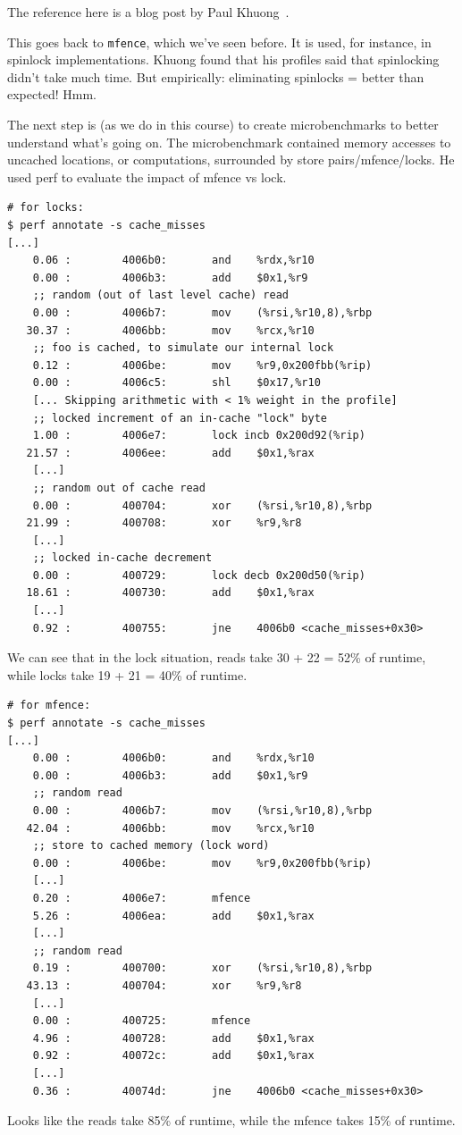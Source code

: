 \documentclass[a4paper]{report}
\begin{document}
The reference here is a blog post by Paul Khuong~\cite{metrics}.

This goes back to {\tt mfence}, which we've seen before. It is used, for instance, in
spinlock implementations. Khuong found that his profiles said that spinlocking didn't take much time.
But empirically: eliminating spinlocks = better than expected! Hmm.

The next step is (as we do in this course) to create microbenchmarks to better understand what's
going on. The microbenchmark contained memory accesses to uncached locations, or computations,
surrounded by store pairs/mfence/locks. He used perf to evaluate the impact of mfence vs lock.

{\scriptsize
\begin{lstlisting}
# for locks:
$ perf annotate -s cache_misses
[...]
    0.06 :        4006b0:       and    %rdx,%r10
    0.00 :        4006b3:       add    $0x1,%r9
    ;; random (out of last level cache) read
    0.00 :        4006b7:       mov    (%rsi,%r10,8),%rbp
   30.37 :        4006bb:       mov    %rcx,%r10
    ;; foo is cached, to simulate our internal lock
    0.12 :        4006be:       mov    %r9,0x200fbb(%rip)
    0.00 :        4006c5:       shl    $0x17,%r10
    [... Skipping arithmetic with < 1% weight in the profile]
    ;; locked increment of an in-cache "lock" byte
    1.00 :        4006e7:       lock incb 0x200d92(%rip)
   21.57 :        4006ee:       add    $0x1,%rax
    [...]
    ;; random out of cache read
    0.00 :        400704:       xor    (%rsi,%r10,8),%rbp
   21.99 :        400708:       xor    %r9,%r8
    [...]
    ;; locked in-cache decrement
    0.00 :        400729:       lock decb 0x200d50(%rip)
   18.61 :        400730:       add    $0x1,%rax
    [...]
    0.92 :        400755:       jne    4006b0 <cache_misses+0x30>
\end{lstlisting}
}

We can see that in the lock situation, reads take 30 + 22 = 52\% of runtime,
while locks take 19 + 21 = 40\% of runtime.

{\scriptsize
\begin{lstlisting}
# for mfence:
$ perf annotate -s cache_misses
[...]
    0.00 :        4006b0:       and    %rdx,%r10
    0.00 :        4006b3:       add    $0x1,%r9
    ;; random read
    0.00 :        4006b7:       mov    (%rsi,%r10,8),%rbp
   42.04 :        4006bb:       mov    %rcx,%r10
    ;; store to cached memory (lock word)
    0.00 :        4006be:       mov    %r9,0x200fbb(%rip)
    [...]
    0.20 :        4006e7:       mfence 
    5.26 :        4006ea:       add    $0x1,%rax
    [...]
    ;; random read
    0.19 :        400700:       xor    (%rsi,%r10,8),%rbp
   43.13 :        400704:       xor    %r9,%r8
    [...]
    0.00 :        400725:       mfence 
    4.96 :        400728:       add    $0x1,%rax
    0.92 :        40072c:       add    $0x1,%rax
    [...]
    0.36 :        40074d:       jne    4006b0 <cache_misses+0x30>
\end{lstlisting}
}
Looks like the reads take 85\% of runtime,
while the mfence takes 15\% of runtime.
\end{document}
